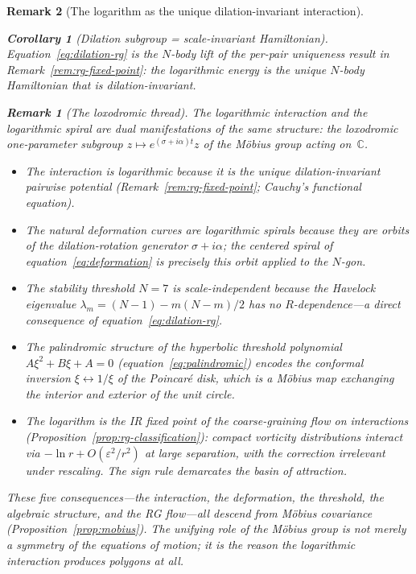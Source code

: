 \documentclass[12pt, a4paper]{article}
\newtheorem{corollary}[theorem]{Corollary}
\newtheorem{remark}{Remark}[section]
\numberwithin{equation}{section}
\begin{document}
\begin{remark}[The logarithm as the unique dilation-invariant interaction]
\begin{corollary}[Dilation subgroup = scale-invariant Hamiltonian]
Equation~\eqref{eq:dilation-rg} is the $N$-body lift of the per-pair
uniqueness result in Remark~\ref{rem:rg-fixed-point}: the logarithmic
energy is the unique $N$-body Hamiltonian that is dilation-invariant.
\end{corollary}

\begin{remark}[The loxodromic thread]
\label{rem:loxodromic}
The logarithmic interaction and the logarithmic spiral are dual
manifestations of the same structure: the loxodromic one-parameter
subgroup $z \mapsto e^{(\sigma + i\alpha)t}z$ of the M\"obius group
acting on~$\mathbb{C}$.
\begin{itemize}
  \item The \emph{interaction} is logarithmic because it is the
    unique dilation-invariant pairwise potential
    (Remark~\ref{rem:rg-fixed-point}; Cauchy's functional equation).
  \item The natural \emph{deformation curves} are logarithmic spirals
    because they are orbits of the dilation-rotation generator
    $\sigma + i\alpha$; the centered spiral of
    equation~\eqref{eq:deformation} is precisely this orbit applied
    to the $N$-gon.
  \item The \emph{stability threshold} $N = 7$ is scale-independent
    because the Havelock eigenvalue $\lambda_m = (N{-}1) - m(N{-}m)/2$
    has no $R$-dependence---a direct consequence of
    equation~\eqref{eq:dilation-rg}.
  \item The \emph{palindromic} structure of the hyperbolic threshold
    polynomial $A\xi^2 + B\xi + A = 0$
    (equation~\eqref{eq:palindromic}) encodes the conformal inversion
    $\xi \leftrightarrow 1/\xi$ of the Poincar\'e disk, which is a
    M\"obius map exchanging the interior and exterior of the unit
    circle.
  \item The logarithm is the \emph{IR fixed point} of the
    coarse-graining flow on interactions
    (Proposition~\ref{prop:rg-classification}): compact vorticity
    distributions interact via $-\ln r + O(\varepsilon^2/r^2)$
    at large separation, with the correction irrelevant under
    rescaling.  The sign rule demarcates the basin of attraction.
\end{itemize}
These five consequences---the interaction, the deformation, the
threshold, the algebraic structure, and the RG flow---all descend
from M\"obius covariance (Proposition~\ref{prop:mobius}).
The unifying role of the M\"obius group is not merely a symmetry
of the equations of motion; it is the reason the logarithmic
interaction produces polygons at all.
\end{remark}


\end{remark}
\end{document}
